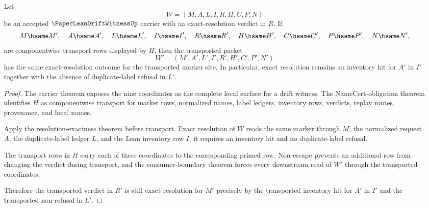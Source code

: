 \begin{theorem}
\label{thm:paper-lean-drift-witness-resolution-stability}
Let
$$
W=(M,A,L,I,R,H,C,P,N)
$$
be an accepted $\PaperLeanDriftWitnessUp$ carrier with an exact-resolution verdict in $R$. If
$$
M \hsame M',\quad A \hsame A',\quad L \hsame L',\quad I \hsame I',\quad R \hsame R',\quad H \hsame H',\quad C \hsame C',\quad P \hsame P',\quad N \hsame N',
$$
are componentwise transport rows displayed by $H$, then the transported packet
$$
W'=(M',A',L',I',R',H',C',P',N')
$$
has the same exact-resolution outcome for the transported marker site. In particular, exact resolution remains an inventory hit for $A'$ in $I'$ together with the absence of duplicate-label refusal in $L'$.
\end{theorem}
\begin{proof}
The carrier theorem exposes the nine coordinates as the complete local surface for a drift witness. The NameCert-obligation theorem identifies $H$ as componentwise transport for marker rows, normalized names, label ledgers, inventory rows, verdicts, replay routes, provenance, and local names.

Apply the resolution-exactness theorem before transport. Exact resolution of $W$ reads the same marker through $M$, the normalized request $A$, the duplicate-label ledger $L$, and the Lean inventory row $I$; it requires an inventory hit and no duplicate-label refusal.

The transport rows in $H$ carry each of these coordinates to the corresponding primed row. Non-escape prevents an additional row from changing the verdict during transport, and the consumer-boundary theorem forces every downstream read of $W'$ through the transported coordinates.

Therefore the transported verdict in $R'$ is still exact resolution for $M'$ precisely by the transported inventory hit for $A'$ in $I'$ and the transported non-refusal in $L'$.
\end{proof}

